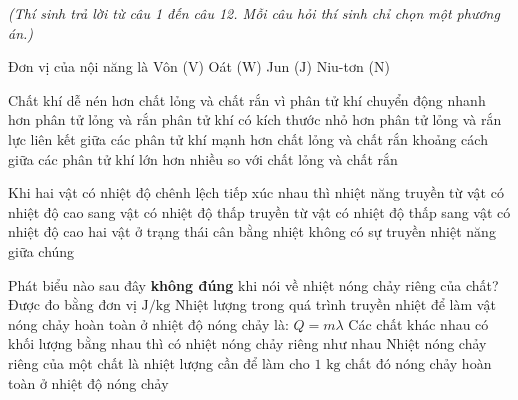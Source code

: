 \vspace{0.15cm}
\begin{flushleft}
	{\color{blue!50!green}}
	\textit{\small (Thí sinh trả lời từ câu 1 đến câu 12. Mỗi câu hỏi thí sinh chỉ chọn một phương án.)}
\end{flushleft}
\setcounter{ex}{0}
\setcounter{bt}{0}

\begin{ex}
	Đơn vị của nội năng là
	\choice
	{Vôn ($\text{V}$)}
	{Oát ($\text{W}$)}
	{\True Jun ($\text{J}$)}
	{Niu-tơn ($\text{N}$)}
\end{ex}

\begin{ex}
	Chất khí dễ nén hơn chất lỏng và chất rắn vì
	\choice
	{phân tử khí chuyển động nhanh hơn phân tử lỏng và rắn}
	{phân tử khí có kích thước nhỏ hơn phân tử lỏng và rắn}
	{lực liên kết giữa các phân tử khí mạnh hơn chất lỏng và chất rắn}
	{\True khoảng cách giữa các phân tử khí lớn hơn nhiều so với chất lỏng và chất rắn}
\end{ex}

\begin{ex}
	Khi hai vật có nhiệt độ chênh lệch tiếp xúc nhau thì nhiệt năng
	\choice
	{\True truyền từ vật có nhiệt độ cao sang vật có nhiệt độ thấp}
	{truyền từ vật có nhiệt độ thấp sang vật có nhiệt độ cao}
	{hai vật ở trạng thái cân bằng nhiệt}
	{không có sự truyền nhiệt năng giữa chúng}
\end{ex}

\begin{ex}
	Phát biểu nào sau đây \textbf{không đúng} khi nói về nhiệt nóng chảy riêng của chất?
	\choice
	{Được đo bằng đơn vị $\text{J/kg}$}
	{Nhiệt lượng trong quá trình truyền nhiệt để làm vật nóng chảy hoàn toàn ở nhiệt độ nóng chảy là: $Q = m\lambda$}
	{\True Các chất khác nhau có khối lượng bằng nhau thì có nhiệt nóng chảy riêng như nhau}
	{Nhiệt nóng chảy riêng của một chất là nhiệt lượng cần để làm cho $1\text{ kg}$ chất đó nóng chảy hoàn toàn ở nhiệt độ nóng chảy}
\end{ex}


